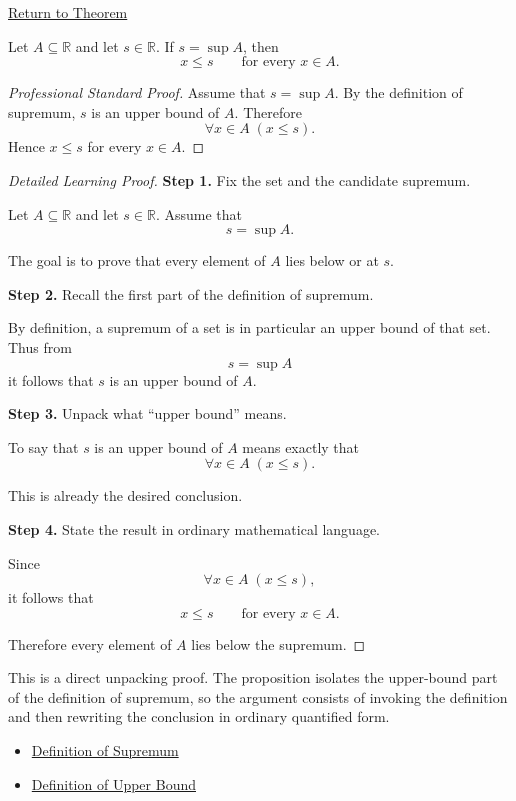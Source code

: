 \newpage
{}
\label{prf:upper-bound-property-of-supremum}

\begin{remark*}[Return]
\hyperref[prop:upper-bound-property-of-supremum]{Return to Theorem}
\end{remark*}

\begin{proposition*}
Let $A \subseteq \mathbb{R}$ and let $s \in \mathbb{R}$. If $s=\sup A$, then
\[
x \le s
\qquad \text{for every } x \in A.
\]
\end{proposition*}

\begin{proof}[Professional Standard Proof]
\LRAProofBodyStart
Assume that $s=\sup A$. By the definition of supremum, $s$ is an upper bound of $A$. Therefore
\[
\forall x \in A \; (x \le s).
\]
Hence $x \le s$ for every $x \in A$.
\end{proof}

\begin{proof}[Detailed Learning Proof]
\LRAProofBodyStart

\textbf{Step 1.} Fix the set and the candidate supremum.

Let $A \subseteq \mathbb{R}$ and let $s \in \mathbb{R}$. Assume that
\[
s=\sup A.
\]

The goal is to prove that every element of $A$ lies below or at $s$.

\textbf{Step 2.} Recall the first part of the definition of supremum.

By definition, a supremum of a set is in particular an upper bound of that set. Thus from
\[
s=\sup A
\]
it follows that $s$ is an upper bound of $A$.

\textbf{Step 3.} Unpack what ``upper bound'' means.

To say that $s$ is an upper bound of $A$ means exactly that
\[
\forall x \in A \; (x \le s).
\]

This is already the desired conclusion.

\textbf{Step 4.} State the result in ordinary mathematical language.

Since
\[
\forall x \in A \; (x \le s),
\]
it follows that
\[
x \le s
\qquad \text{for every } x \in A.
\]

Therefore every element of $A$ lies below the supremum.
\end{proof}

\begin{remark*}
This is a direct unpacking proof. The proposition isolates the upper-bound part of the definition of supremum, so the argument consists of invoking the definition and then rewriting the conclusion in ordinary quantified form.
\end{remark*}

\begin{dependencies}
\begin{itemize}
  \item \hyperref[def:supremum]{Definition of Supremum}
  \item \hyperref[def:upper-bound]{Definition of Upper Bound}
\end{itemize}
\end{dependencies}

\clearpage
